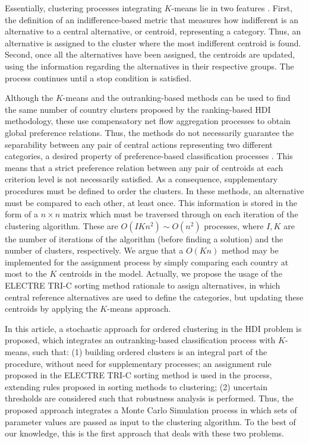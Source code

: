 \documentclass[]{elsarticle}
\theoremstyle{definition}
\begin{document}
Essentially, clustering processes integrating $K$-means lie in two features \citep{DeSmet2009,Lolli2014,Panapakidis2018, Chen2018}. First, the definition of  an indifference-based metric that measures how indifferent is an alternative to a central alternative, or centroid, representing a category. Thus, an alternative is assigned to the cluster where the most indifferent centroid is found. Second, once all the alternatives have been assigned, the centroids are updated, using the information regarding the alternatives in their respective groups.  The process continues until a stop condition is satisfied. 

Although the $K$-means and the outranking-based methods can be used to find the same number of country clusters proposed by the ranking-based HDI methodology, these use compensatory net flow aggregation processes to obtain global preference relations. Thus, the methods do not necessarily guarantee the separability between any pair of central actions representing two different categories, a desired property of preference-based classification processes \citep{roy2012}. This means that a strict preference relation between any pair of centroids at each criterion level is not necessarily satisfied. As a consequence, supplementary procedures must be defined to order the clusters.  In these methods,  an alternative must be compared to each other, at least once. This information is stored in the form of a $n \times n$ matrix which must be traversed through on each iteration of the clustering algorithm. These are $O(IKn^2) \sim O(n^2)$ processes, where $I, K$ are the number of iterations of the algorithm (before finding a solution) and the number of clusters, respectively. We argue that a $O(Kn)$ method may be implemented for the assignment process by simply comparing each country at most to the $K$ centroids in the model.  Actually, we propose the usage of the ELECTRE TRI-C sorting method rationale to assign alternatives, in which central reference alternatives are used to define the categories, but updating these centroids by applying the $K$-means approach.

In this article, a stochastic approach for ordered clustering in the HDI problem is proposed, which integrates an outranking-based classification process with $K$-means, such that:  (1) building ordered clusters is an integral part of the procedure, without need for supplementary processes; an assignment rule proposed in the ELECTRE TRI-C sorting method \citep{almeida2008,Almeida2012} is used in the process, extending rules proposed in sorting methods to clustering; (2) uncertain thresholds are considered such that robustness analysis is performed. Thus, the proposed approach integrates  a Monte Carlo Simulation process in which sets of  parameter values are passed as input to the clustering algorithm. To the best of our knowledge, this is the first approach that deals with these two problems.
\end{document}

